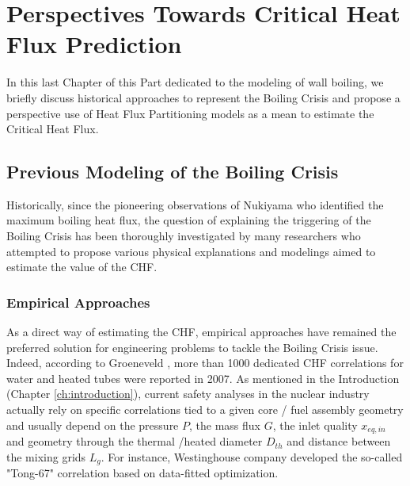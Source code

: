 
\chapter{Perspectives Towards Critical Heat Flux Prediction} %

\label{ch:to_CHF} %

\minitoc

In this last Chapter of this Part dedicated to the modeling of wall boiling, we briefly discuss historical approaches to represent the Boiling Crisis and propose a perspective use of Heat Flux Partitioning models as a mean to estimate the Critical Heat Flux.


\section{Previous Modeling of the Boiling Crisis}

Historically, since the pioneering observations of Nukiyama \cite{nukiyama_maximum_1966} who identified the maximum boiling heat flux, the question of explaining the triggering of the Boiling Crisis has been thoroughly investigated by many researchers who attempted to propose various physical explanations and modelings aimed to estimate the value of the CHF.


\subsection{Empirical Approaches}

As a direct way of estimating the CHF, empirical approaches have remained the preferred solution for engineering problems to tackle the Boiling Crisis issue. Indeed, according to Groeneveld \cite{groeneveld_2006_2007}, more than 1000 dedicated CHF correlations for water and heated tubes were reported in 2007. As mentioned in the Introduction (Chapter \ref{ch:introduction}), current safety analyses in the nuclear industry actually rely on specific correlations tied to a given core / fuel assembly geometry and usually depend on the pressure $P$, the mass flux $G$, the inlet quality $x_{eq,in}$ and geometry through the thermal /heated diameter $D_{th}$ and distance between the mixing grids $L_{g}$. For instance, Westinghouse company developed the so-called "Tong-67" correlation \cite{tong_prediction_1967} based on data-fitted optimization. 

